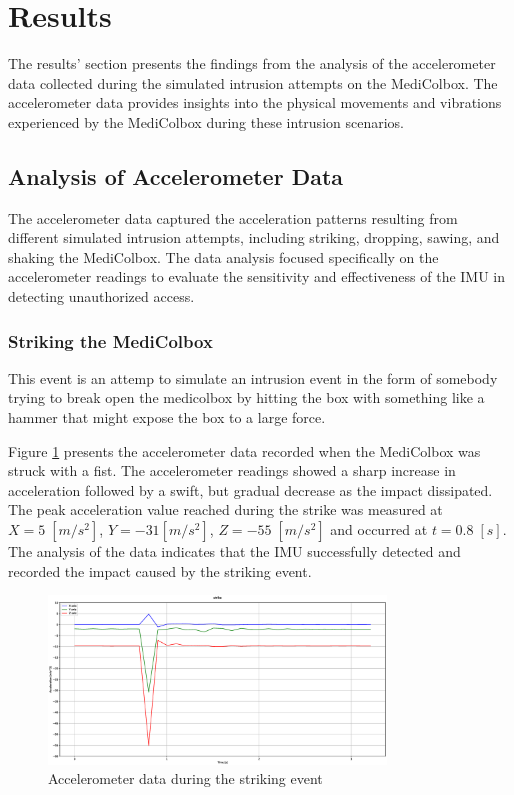 \documentclass[../main.tex]{subfiles}
\begin{document}
\clearpage

\section{Results}
The results' section presents the findings from the analysis of
the accelerometer data collected during the simulated intrusion attempts
on the MediColbox.
The accelerometer data provides insights into the physical movements
and vibrations experienced by the MediColbox during these intrusion scenarios.

\subsection{Analysis of Accelerometer Data}

The accelerometer data captured the acceleration patterns resulting from different simulated intrusion attempts, including striking, dropping, sawing, and shaking the MediColbox.
The data analysis focused specifically on the accelerometer readings to evaluate the sensitivity and effectiveness of the IMU in detecting unauthorized access.

\subsubsection{Striking the MediColbox}

This event is an attemp to simulate an intrusion event in the form of
somebody trying to break open the \gls{medicolbox} by hitting the box with something like a hammer that might expose the box to a large force.

Figure \ref{fig:accelerometer_striking} presents the
accelerometer data recorded when the MediColbox was
struck with a fist.
The accelerometer readings showed a sharp increase in
acceleration followed by a swift, but gradual decrease as
the impact dissipated.
The peak acceleration value reached during the
strike was measured at
$X = 5\;[m/s^2]$, $Y = -31 [m/s^2]$, $Z = -55\;[m/s^2]$
and occurred at $t = 0.8\;[s]$.
The analysis of the data indicates that the
IMU successfully detected and recorded the impact caused by the
striking event.

\begin{figure}[htbp]
    \centering
    \includegraphics[width=0.8\textwidth]{resources/figures/Acceleration_strike.eps}
    \caption{Accelerometer data during the striking event}
    \label{fig:accelerometer_striking}
\end{figure}
\end{document}
